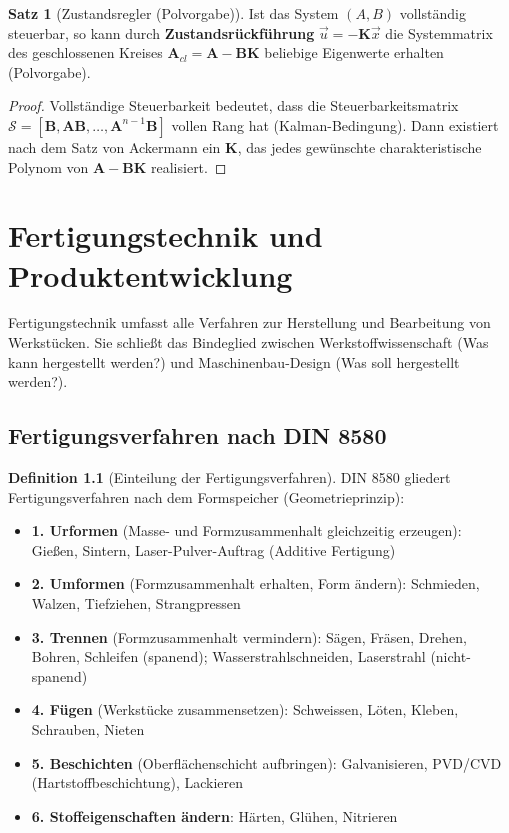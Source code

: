 ﻿\documentclass[a4paper,12pt]{report}
\theoremstyle{definition}
\newtheorem{definition}{Definition}
\newtheorem{satz}{Satz}
\begin{document}
\begin{satz}[Zustandsregler (Polvorgabe)]
Ist das System $(A, B)$ vollst\"andig steuerbar, so kann durch
\textbf{Zustandsr\"uckf\"uhrung} $\vec{u} = -\mathbf{K}\vec{x}$
die Systemmatrix des geschlossenen Kreises
$\mathbf{A}_{cl} = \mathbf{A} - \mathbf{B}\mathbf{K}$
beliebige Eigenwerte erhalten (Polvorgabe).
\end{satz}
\begin{proof}
Vollst\"andige Steuerbarkeit bedeutet, dass die Steuer\-barkeitsmatrix
$\mathcal{S} = [\mathbf{B}, \mathbf{A}\mathbf{B}, \ldots, \mathbf{A}^{n-1}\mathbf{B}]$
vollen Rang hat (Kalman-Bedingung). Dann existiert nach dem Satz von
Ackermann ein $\mathbf{K}$, das jedes gew\"unschte charakteristische
Polynom von $\mathbf{A} - \mathbf{B}\mathbf{K}$ realisiert.
\end{proof}

\chapter{Fertigungstechnik und Produktentwicklung}

Fertigungstechnik umfasst alle Verfahren zur Herstellung und
Bearbeitung von Werkst\"ucken. Sie schlie\ss{}t das Bindeglied zwischen
Werkstoffwissenschaft (Was kann hergestellt werden?) und
Maschinenbau-Design (Was soll hergestellt werden?).

\section{Fertigungsverfahren nach DIN 8580}

\begin{definition}[Einteilung der Fertigungsverfahren]
DIN 8580 gliedert Fertigungsverfahren nach dem Formspeicher (Geometrieprinzip):
\begin{itemize}
    \item[-] \textbf{1. Urformen} (Masse- und Formzusammenhalt gleichzeitig erzeugen):
          Gie\ss{}en, Sintern, Laser-Pulver-Auftrag (Additive Fertigung)
    \item[-] \textbf{2. Umformen} (Formzusammenhalt erhalten, Form \"andern):
          Schmieden, Walzen, Tiefziehen, Strangpressen
    \item[-] \textbf{3. Trennen} (Formzusammenhalt vermindern):
          S\"agen, Fr\"asen, Drehen, Bohren, Schleifen (spanend);
          Wasserstrahlschneiden, Laserstrahl (nicht-spanend)
    \item[-] \textbf{4. F\"ugen} (Werkst\"ucke zusammensetzen):
          Schweissen, L\"oten, Kleben, Schrauben, Nieten
    \item[-] \textbf{5. Beschichten} (Oberfl\"achenschicht aufbringen):
          Galvanisieren, PVD/CVD (Hartstoffbeschichtung), Lackieren
    \item[-] \textbf{6. Stoffeigenschaften \"andern}: H\"arten, Gl\"uhen, Nitrieren
\end{itemize}
\end{definition}
\end{document}
